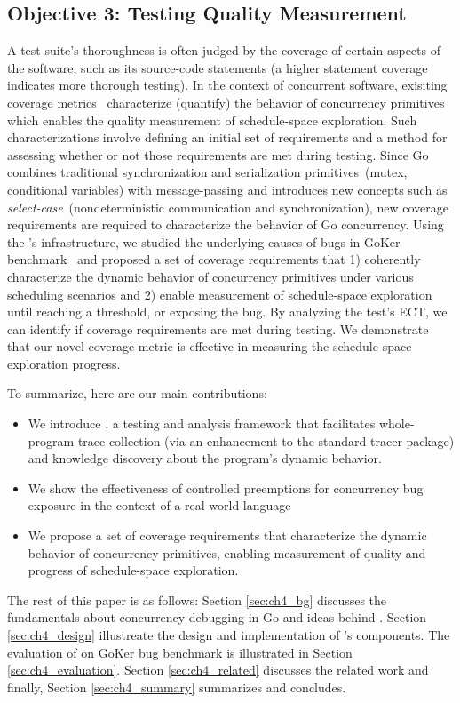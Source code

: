 \subsection{Objective 3: Testing Quality Measurement}
A test suite's thoroughness is often judged by the coverage of certain aspects of the software, such as its source-code statements (a higher statement coverage indicates more thorough testing).
%
In the context of concurrent software, exisiting coverage metrics~\cite{edelstein2003contest,trainin-followsCoverage-padtad09,hong-syncTesting-issta12,yu-pset-isca09} characterize (quantify) the behavior of concurrency primitives which enables the quality measurement of schedule-space exploration.
%
Such characterizations involve defining an initial set of requirements and a method for assessing whether or not those requirements are met during testing.
%
Since Go combines traditional synchronization and serialization primitives~(mutex, conditional variables) with message-passing and introduces new concepts such as \textit{select-case}~(nondeterministic communication and synchronization), new coverage requirements are required to characterize the behavior of Go concurrency.
%
Using the \goat's infrastructure, we studied the underlying causes of bugs in GoKer benchmark~\cite{yuan-gobench-cgo21} and proposed a set of coverage requirements that 1) coherently characterize the dynamic behavior of concurrency primitives under various scheduling scenarios and 2) enable measurement of schedule-space exploration until reaching a threshold, or exposing the bug.
%
By analyzing the test's ECT, we can identify if coverage requirements are met during testing.
%
We demonstrate that our novel coverage metric is effective in measuring the schedule-space exploration progress.


To summarize, here are our main contributions:
\begin{itemize}
    \item We introduce \goat, a testing and analysis framework that facilitates whole-program trace collection (via an enhancement to the standard tracer package) and knowledge discovery about the program's dynamic behavior.
    \item We show the effectiveness of controlled preemptions for concurrency bug exposure in the context of a real-world language
    \item We propose a set of coverage requirements that characterize the dynamic behavior of concurrency primitives, enabling measurement of quality and progress of schedule-space exploration.
\end{itemize}

The rest of this paper is as follows: Section \ref{sec:ch4_bg} discusses the fundamentals about concurrency debugging in Go and ideas behind \goat. Section \ref{sec:ch4_design} illustreate the design and implementation of \goat's components. The evaluation of \goat on GoKer bug benchmark is illustrated in Section \ref{sec:ch4_evaluation}. Section \ref{sec:ch4_related} discusses the related work and finally, Section \ref{sec:ch4_summary} summarizes and concludes.
